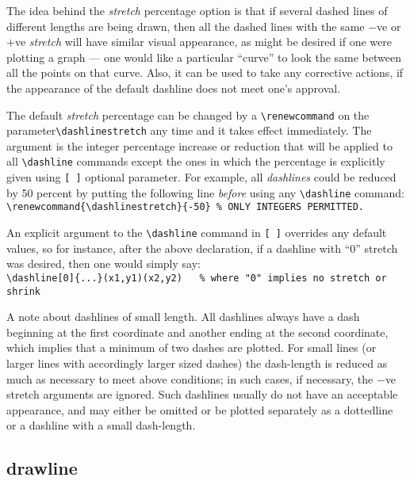 The idea behind the {\it stretch\/} percentage option is that if several
dashed lines of different lengths are being drawn, then all the dashed lines
with the same $-$ve or $+$ve {\it stretch\/} will have similar visual
appearance, as might be desired if one were plotting a graph --- one would
like a particular ``curve'' to look the same between all the points on that
curve. Also, it can be used to take any corrective actions, if the appearance
of the default dashline does not meet one's approval.

The default {\it stretch\/} percentage can be changed by a
\verb|\renewcommand| on the parameter\linebreak \verb|\dashlinestretch| any
time and it
takes effect immediately. The argument is the integer percentage increase or
reduction that will be applied to all \verb|\dashline| commands except the
ones in which the percentage is explicitly given using \verb|[ ]| optional
parameter. For example, all {\it dashlines\/} could be reduced by 50 percent
by putting the following line {\it before\/} using any \verb|\dashline|
command:\\[2mm]
\hspace*{\leftmargin}\verb|\renewcommand{\dashlinestretch}{-50} % ONLY INTEGERS PERMITTED.|

An explicit argument to the \verb|\dashline| command in \verb|[ ]|
overrides any default values, so for instance, after the above declaration,
if a dashline with ``0'' stretch was desired,
then one would simply say:\\[2mm]
\hspace*{\leftmargin}\verb|\dashline[0]{...}(x1,y1)(x2,y2)   % where "0" implies no stretch or shrink|

A note about dashlines of small length. All dashlines always have a dash
beginning at the first coordinate and another ending at the second
coordinate, which implies that a minimum of two dashes are plotted. For small
lines (or larger lines with accordingly larger sized dashes) the dash-length
is reduced as much as necessary to meet above conditions; in such cases, if
necessary, the $-$ve stretch arguments are ignored. Such dashlines
usually do not have an acceptable appearance, and may either be omitted or be
plotted separately as a dottedline or a dashline with a small dash-length.

\subsection{{\tt \bs}drawline}

